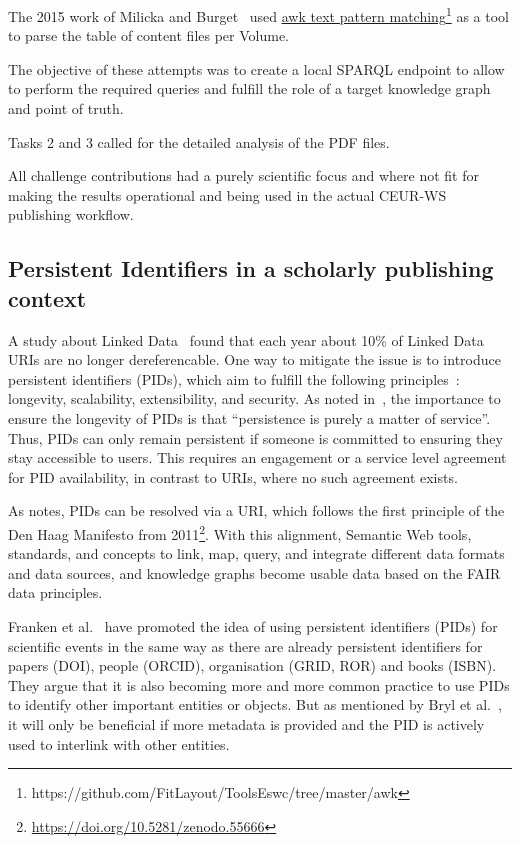 \documentclass[]{ceurart}
\newcommand{\tquote}[1]{``#1''}
\newcommand{\footnotelink}[2]{\href{#1}{#2}\footnote{#1}}
\begin{document}
The 2015 work of Milicka and Burget~\cite{Milicka2015} used \footnotelink{https://github.com/FitLayout/ToolsEswc/tree/master/awk}{awk text pattern matching} as a tool to parse the table of content files per Volume.

The objective of these attempts was to create a local SPARQL endpoint to allow to perform the required queries and fulfill the role of a target knowledge graph and point of truth. 

Tasks 2 and 3 called for the detailed analysis of the PDF files.

All challenge contributions had a purely scientific focus and where not fit for making the results operational and being used in the actual CEUR-WS publishing workflow. 
\subsection{Persistent Identifiers in a scholarly publishing context}\label{sec:event_pids}
A study about Linked Data~\cite{Kafer2013} found that each year about 10\% of Linked Data URIs are no longer dereferencable.
One way to mitigate the issue is to introduce persistent identifiers (PIDs), which aim to fulfill the following principles~\cite{Sollins2012}: longevity, scalability, extensibility, and security.
As noted in~\cite{kunze-ark-36}, the importance to ensure the longevity of PIDs is that \tquote{persistence is purely a matter of service}.
Thus, PIDs can only remain persistent if someone is committed to ensuring they stay accessible to users.
This requires an engagement or a service level agreement for PID availability, in contrast to URIs, where no such agreement exists.

As \cite{Cousijn2021} notes, PIDs can be resolved via a URI, which follows the first principle of the Den Haag Manifesto from 2011\footnote{\url{https://doi.org/10.5281/zenodo.55666}}.
With this alignment, Semantic Web tools, standards, and concepts to link, map, query, and integrate different data formats and data sources, and knowledge graphs become usable data based on the FAIR data principles. 

Franken et al.~\cite{Franken2022} have promoted the idea of using persistent identifiers (PIDs) for scientific events in the same way as there are already persistent identifiers for papers (DOI), people (ORCID), organisation (GRID, ROR) and books (ISBN).  They argue that it is also becoming more and more common practice to use PIDs to identify other important entities or objects.
But as mentioned by Bryl et al.~\cite{BrylEtAl:SePublica2014}, it will only be beneficial if more metadata is provided and the PID is actively used to interlink with other entities.
\end{document}

